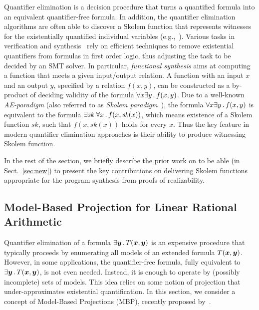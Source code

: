 Quantifier elimination is a decision procedure that turns a quantified formula into an equivalent quantifier-free formula.
In addition, the quantifier elimination algorithms are often able to discover a Skolem function that represents witnesses for the existentially quantified individual variables (e.g.,~\cite{DBLP:conf/cav/BalabanovJ11,DBLP:journals/sttt/KuncakMPS13,KLXJOIA,Chakraborty15}).
%
Various tasks in verification and synthesis~\cite{DBLP:conf/fmcad/CimattiGMT13,DBLP:conf/popl/BeyeneCPR14,DBLP:conf/nfm/GasconT14} rely on efficient techniques to remove existential quantifiers from formulas in first order logic, thus adjusting the task to be decided by an SMT solver.
In particular, \emph{functional synthesis} aims at computing a function that meets a given input/output relation.
A function with an input $x$ and an output $y$, specified by a relation $f(x,y)$, can be constructed as a by-product of deciding validity of the formula $\forall x \exists y \,.\, f(x,y)$.
Due to a well-known \emph{AE-paradigm} (also referred to as \emph{Skolem paradigm}~\cite{DBLP:conf/popl/PnueliR89}),
the formula $\forall x \exists y \,.\, f(x,y)$ is equivalent to the formula $\exists \mathit{sk} \; \forall x \,.\, f(x, \mathit{sk}(x))$, which means existence of a Skolem function $\mathit{sk}$, such that $f(x,\mathit{sk}(x))$ holds for every $x$.
Thus the key feature in modern quantifier elimination approaches is their ability to produce witnessing Skolem function.

In the rest of the section, we briefly describe the prior work on \aeval to be able (in Sect.~\ref{sec:new}) to present the key contributions on delivering Skolem functions appropriate for the program synthesis from proofs of realizability.

\subsection{Model-Based Projection for Linear Rational Arithmetic}
\label{sec:mbp}

Quantifier elimination of a formula $\exists \vy \such T(\vx,\vy)$ is an expensive procedure that typically proceeds by enumerating all models of an extended formula $T(\vx,\vy)$.
However, in some applications, the quantifier-free formula, fully equivalent to $\exists \vy \such T(\vx,\vy)$, is not even needed.
Instead, it is enough to operate by (possibly incomplete) sets of models.
This idea relies on some notion of projection that under-approximates existential quantification.
In this section, we consider a concept of Model-Based Projections (MBP), recently proposed by~\cite{komuravelli2014smt,Dutertre}.

